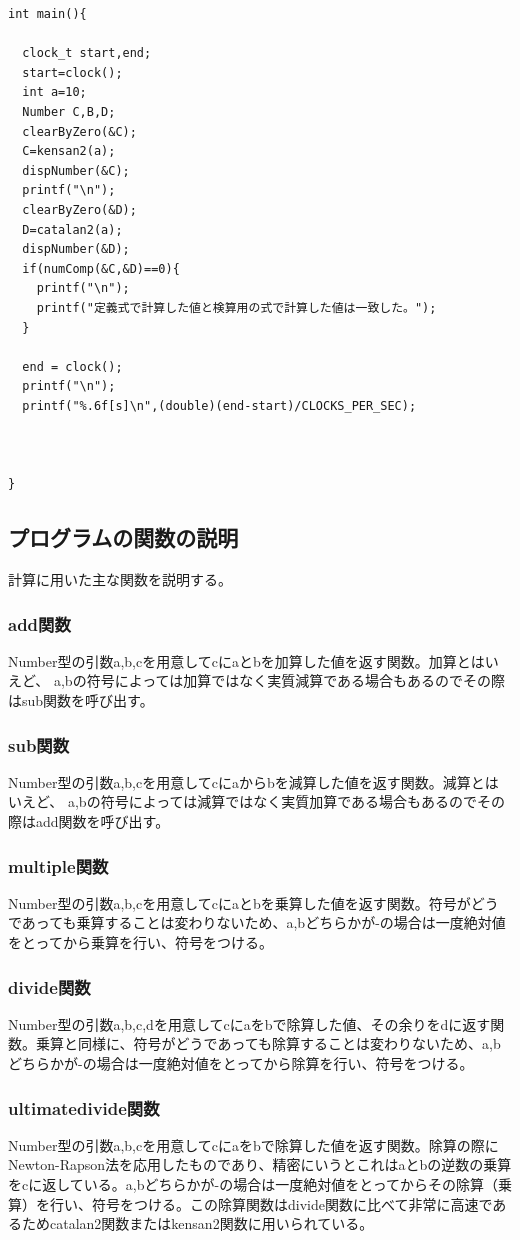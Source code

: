 \documentclass[a4j,dvipdfmx,titlepage]{jarticle}
\begin{document}
\begin{lstlisting}[caption=今回作成したC言語プログラム,label=program]
int main(){

  clock_t start,end;
  start=clock();
  int a=10;
  Number C,B,D;
  clearByZero(&C); 
  C=kensan2(a);
  dispNumber(&C);
  printf("\n"); 
  clearByZero(&D);
  D=catalan2(a);
  dispNumber(&D);
  if(numComp(&C,&D)==0){
    printf("\n");
    printf("定義式で計算した値と検算用の式で計算した値は一致した。");
  }  

  end = clock();
  printf("\n");
  printf("%.6f[s]\n",(double)(end-start)/CLOCKS_PER_SEC);
  

  
}  
\end{lstlisting}

\subsection{プログラムの関数の説明}
計算に用いた主な関数を説明する。
\subsubsection{add関数}
Number型の引数a,b,cを用意してcにaとbを加算した値を返す関数。加算とはいえど、
a,bの符号によっては加算ではなく実質減算である場合もあるのでその際はsub関数を呼び出す。
\subsubsection{sub関数}
Number型の引数a,b,cを用意してcにaからbを減算した値を返す関数。減算とはいえど、
a,bの符号によっては減算ではなく実質加算である場合もあるのでその際はadd関数を呼び出す。
\subsubsection{multiple関数}
Number型の引数a,b,cを用意してcにaとbを乗算した値を返す関数。符号がどうであっても乗算することは変わりないため、a,bどちらかが-の場合は一度絶対値をとってから乗算を行い、符号をつける。

\subsubsection{divide関数}
Number型の引数a,b,c,dを用意してcにaをbで除算した値、その余りをdに返す関数。乗算と同様に、符号がどうであっても除算することは変わりないため、a,bどちらかが-の場合は一度絶対値をとってから除算を行い、符号をつける。
\subsubsection{ultimatedivide関数}
Number型の引数a,b,cを用意してcにaをbで除算した値を返す関数。除算の際にNewton-Rapson法を応用したものであり、精密にいうとこれはaとbの逆数の乗算をcに返している。a,bどちらかが-の場合は一度絶対値をとってからその除算（乗算）を行い、符号をつける。この除算関数はdivide関数に比べて非常に高速であるためcatalan2関数またはkensan2関数に用いられている。
\end{document}
